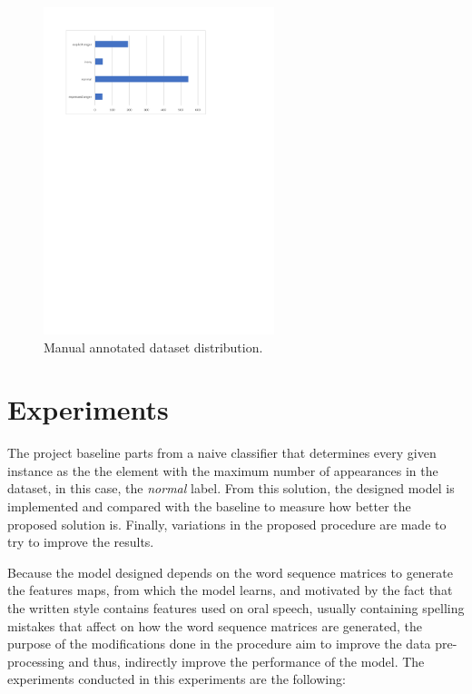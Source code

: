\begin{figure}[!htp]
  \center
  \includegraphics[width=0.6\textwidth]{figures/manual_annotation_dataset_distribution}
  \caption{Manual annotated dataset distribution.}
  \label{fig:manual_annotation_dataset_distribution}
\end{figure}

\section{Experiments}

The project baseline parts from a naive classifier that determines every given instance as the the element with the maximum number of appearances in the dataset, in this case, the \textit{normal} label. From this solution, the designed model is implemented and compared with the baseline to measure how better the proposed solution is. Finally, variations in the proposed procedure are made to try to improve the results.

Because the model designed depends on the word sequence matrices to generate the features maps, from which the model learns, and motivated by the fact that the written style contains features used on oral speech, usually containing spelling mistakes that affect on how the word sequence matrices are generated, the purpose of the modifications done in the procedure aim to improve the data pre-processing and thus, indirectly improve the performance of the model. The experiments conducted in this experiments are the following:

